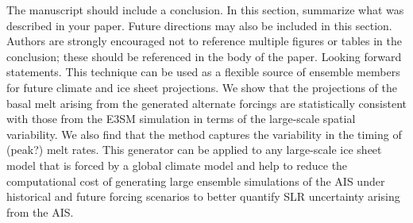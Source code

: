 The manuscript should include a conclusion. In this section, summarize what was described in your paper. Future directions may also be included in this section. Authors are strongly encouraged not to reference multiple figures or tables in the conclusion; these should be referenced in the body of the paper. Looking forward statements. This technique can be used as a flexible source of ensemble members for future climate and ice sheet projections. We show that the projections of the basal melt arising from the generated alternate forcings are statistically consistent with those from the E3SM simulation in terms of the large-scale spatial variability. We also find that the method captures the variability in the timing of (peak?) melt rates. This generator can be applied to any large-scale ice sheet model that is forced by a global climate model and help to reduce the computational cost of generating large ensemble simulations of the AIS under historical and future forcing scenarios to better quantify SLR uncertainty arising from the AIS.